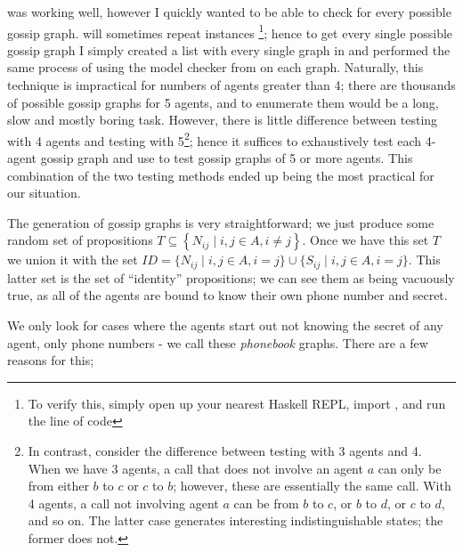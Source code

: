 \documentclass[10pt, a4paper]{report}
\begin{document}
 was working well, however I quickly wanted to be able to check
for every possible gossip graph.  will sometimes repeat
instances \footnote{To verify this, simply open up your nearest Haskell REPL,
  import , and run the line of code }; hence to get every single
possible gossip graph I simply created a list with every single graph in and
performed the same process of using the model checker from \cite{GithubGossip}
on each graph. Naturally, this technique is impractical for numbers of agents
greater than 4; there are thousands of possible gossip graphs for 5 agents, and
to enumerate them would be a long, slow and mostly boring task. However, there
is little difference between testing with 4 agents and testing with
5\footnote{In contrast, consider the difference between testing with 3 agents
  and 4. When we have 3 agents, a call that does not involve an agent $a$ can
  only be from either $b$ to $c$ or $c$ to $b$; however, these are essentially
  the same call. With 4 agents, a call not involving agent $a$ can be from $b$
  to $c$, or $b$ to $d$, or $c$ to $d$, and so on. The latter case generates
  interesting indistinguishable states; the former does not.}; hence it suffices
to exhaustively test each 4-agent gossip graph and use  to test
gossip graphs of 5 or more agents. This combination of the two testing methods
ended up being the most practical for our situation.

The generation of gossip graphs is very straightforward; we just produce some
random set of propositions $T \subseteq \left\{ N_{ij} \mid i, j \in A, i \not = j
\right\}$. Once we have this set $T$ we union it with the set $ID = \{N_{ij} \mid i,
j \in A, i = j\} \cup \{S_{ij} \mid i, j \in A, i = j\}$. This latter set is the
set of ``identity'' propositions; we can see them as being vacuously true, as
all of the agents are bound to know their own phone number and secret.

We only look for cases where the agents start out not knowing the secret 
of any agent, only phone numbers - we call these \emph{phonebook} graphs.
There are a few reasons for this;
\end{document}
